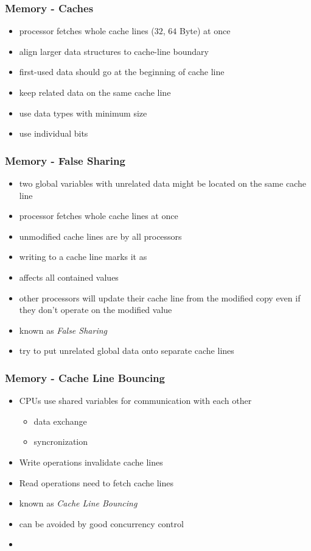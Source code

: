 \begin{frame}
 \frametitle{Memory - Caches}
 \begin{itemize}
  \item processor fetches whole cache lines (\( 32 \), \( 64 \) Byte) at once
  \item align larger data structures to cache-line boundary
  \item first-used data should go at the beginning of cache line
  \item keep related data on the same cache line
  \item use data types with minimum size
  \item use individual bits
 \end{itemize}
\end{frame}

\begin{frame}
 \frametitle{Memory - False Sharing}
 \begin{itemize}
  \item two global variables with unrelated data might be located on the same cache line
  \item processor fetches whole cache lines at once
  \item unmodified cache lines are  by all processors
  \item writing to a cache line marks it as 
  \item affects all contained values
  \item other processors will update their cache line from the modified copy even if they don't operate on the modified value
  \item known as \textit{False Sharing}
  \item try to put unrelated global data onto separate cache lines
 \end{itemize}
\end{frame}

\begin{frame}
 \frametitle{Memory - Cache Line Bouncing}
 \begin{itemize}
  \item CPUs use shared variables for communication with each other
   \begin{itemize}
    \item data exchange
    \item syncronization
   \end{itemize}
  \item Write operations invalidate cache lines
  \item Read operations need to fetch cache lines
  \item known as \textit{Cache Line Bouncing}
  \item can be avoided by good concurrency control
  \item {}
 \end{itemize}
\end{frame}

